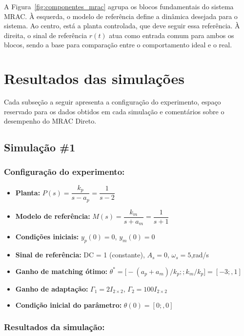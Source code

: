 \documentclass[10pt]{article}
\begin{document}
A Figura~\ref{fig:componentes_mrac} agrupa os blocos fundamentais do sistema MRAC. À esquerda, o modelo de referência define a dinâmica desejada para o sistema. Ao centro, está a planta controlada, que deve seguir essa referência. À direita, o sinal de referência $r(t)$ atua como entrada comum para ambos os blocos, sendo a base para comparação entre o comportamento ideal e o real.

\section{Resultados das simulações}

Cada subseção a seguir apresenta a configuração do experimento, espaço reservado para os dados obtidos em cada simulação e comentários sobre o desempenho do MRAC Direto.

\subsection{Simulação \#1}
\subsubsection{Configuração do experimento:}
\begin{itemize}
\item \textbf{Planta:} $P(s) = \dfrac{k_p}{s - a_p} = \dfrac{1}{s - 2}$
\item \textbf{Modelo de referência:} $M(s) = \dfrac{k_m}{s + a_m} = \dfrac{1}{s + 1}$
\item \textbf{Condições iniciais:} $y_p(0)=0$, $y_m(0)=0$
\item \textbf{Sinal de referência:} DC = 1 (constante), $A_s=0$, $\omega_s=5$,rad/s
\item \textbf{Ganho de matching ótimo:} $\theta^* = \bigl[-(a_p + a_m)/k_p;;k_m/k_p\bigr] = [-3;,1]$
\item \textbf{Ganho de adaptação:} $\Gamma_1 = 2I_{2\times2}$, $\Gamma_2 = 100 I_{2\times2}$
\item \textbf{Condição inicial do parâmetro:} $\theta(0) = [0;,0]$
\end{itemize}

\subsubsection{Resultados da simulação:}
\end{document}
